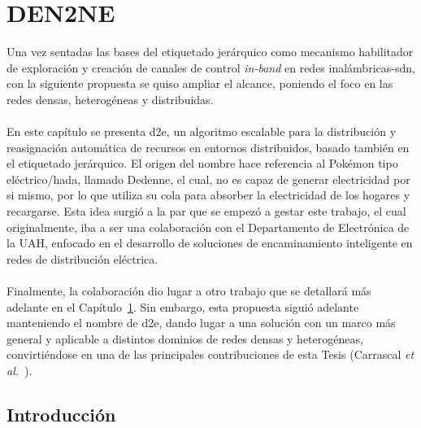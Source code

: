 \chapter{DEN2NE}
\label{ch:den2ne}


Una vez sentadas las bases del etiquetado jerárquico como mecanismo habilitador de exploración y creación de canales de control \textit{in-band} en redes inalámbricas-\gls{sdn}, con la siguiente propuesta se quiso ampliar el alcance, poniendo el foco en las redes densas, heterogéneas y distribuidas.\\
\\
En este capítulo se presenta \gls{d2e}, un algoritmo escalable para la distribución y reasignación automática de recursos en entornos distribuidos, basado también en el etiquetado jerárquico. El origen del nombre hace referencia al Pokémon tipo eléctrico/hada, llamado Dedenne, el cual, no es capaz de generar electricidad por si mismo, por lo que utiliza su cola para absorber la electricidad de los hogares y recargarse. Esta idea surgió a la par que se empezó a gestar este trabajo, el cual originalmente, iba a ser una colaboración con el Departamento de Electrónica de la UAH, enfocado en el desarrollo de soluciones de encaminamiento inteligente en redes de distribución eléctrica.\\
\\
Finalmente, la colaboración dio lugar a otro trabajo que se detallará más adelante en el Capítulo~\ref{ch:den2ne}. Sin embargo, esta propuesta siguió adelante manteniendo el nombre de \gls{d2e}, dando lugar a una solución con un marco más general y aplicable a distintos dominios de redes densas y heterogéneas, convirtiéndose en una de las principales contribuciones de esta Tesis (Carrascal \textit{et al.}~\cite{carrascal2024topology}).  

\section{Introducción}

